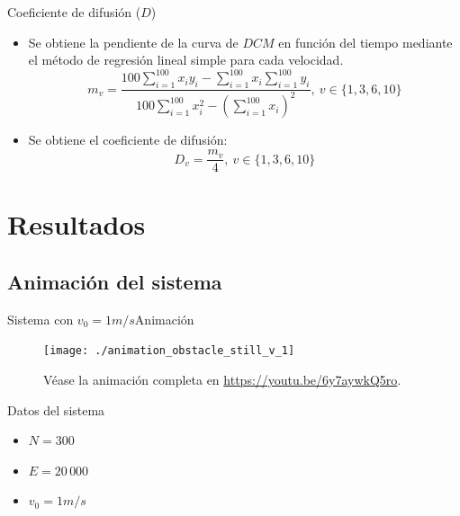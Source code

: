 \documentclass{beamer}
\begin{document}
            \begin{frame}{Coeficiente de difusión ($D$)}
                \begin{itemize}
                    \item Se obtiene la pendiente de la curva de $DCM$ en función del tiempo mediante el método
                    de regresión lineal simple para cada velocidad.
                    \begin{equation*}
                        m_v = \frac{100 \sum_{i=1}^{100} x_i y_i - \sum_{i=1}^{100} x_i \sum_{i=1}^{100} y_i }{100 \sum_{i=1}^{100} x_i^2
                        - \left(\sum_{i=1}^{100} x_i \right)^2},\ v \in \{1, 3, 6, 10\}
                    \end{equation*}
                    \item Se obtiene el coeficiente de difusión:
                    \begin{equation*}
                        D_v = \frac{m_v}{4},\ v \in \{1, 3, 6, 10\}
                    \end{equation*}
                \end{itemize}
            \end{frame}

    \section{Resultados}

        \subsection{Animación del sistema}

            \begin{frame}{Sistema con $v_0=1m/s$}{Animación}
                \begin{minipage}[t]{0.60\textwidth}
                    \begin{figure}[H!]
                        \texttt{[image: ./animation\_obstacle\_still\_v\_1]}
                        \caption*{Véase la animación completa en \url{https://youtu.be/6y7aywkQ5ro}.}
                        \label{fig:a_1}
                    \end{figure}
                \end{minipage}
                \hfill
                \begin{minipage}[t]{0.30\textwidth}
                    \begin{block}{Datos del sistema}
                        \begin{itemize}
                            \item $N=300$
                            \item $E=20\,000$
                            \item $v_0 = 1 m/s$
                        \end{itemize}
                    \end{block}
                \end{minipage}
            \end{frame}
\end{document}
